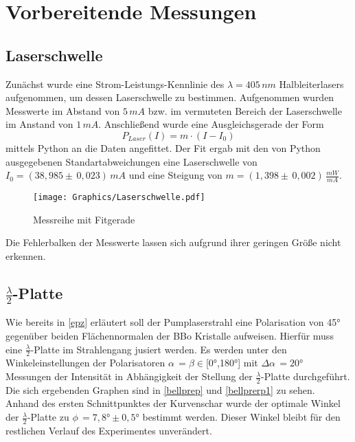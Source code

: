\documentclass[twoside,colorback,accentcolor=tud4c,11pt]{tudreport}
\begin{document}
\section{Vorbereitende Messungen}
\subsection{Laserschwelle}
Zunächst wurde eine Strom-Leistungs-Kennlinie des $\lambda=405\,\si{nm}$ Halbleiterlasers aufgenommen, um dessen Laserschwelle zu bestimmen. Aufgenommen wurden Messwerte im Abstand von $5\,\si{mA}$ bzw. im vermuteten Bereich der Laserschwelle im Anstand von $1\,\si{mA}$. Anschließend wurde eine Ausgleichsgerade der Form
\begin{equation}
P_{Laser}(I)=m\cdot\left(I-I_{0}\right)
\end{equation}
mittels Python an die Daten angefittet. Der Fit ergab mit den von Python ausgegebenen Standartabweichungen eine Laserschwelle von $I_{0}=\left(38,985\pm\,0,023\right)\,\si{mA}$ und eine Steigung von $m=\left(1,398\pm\,0,002\right)\,\si{\frac{mW}{mA}}$.
\begin{figure}[H]
\centering
   	\begin{minipage}[b]{1.0\textwidth}
   	\texttt{[image: Graphics/Laserschwelle.pdf]}
   	\caption{Messreihe mit Fitgerade}
  	\label{laserschwelle}
   	\end{minipage}
\end{figure}
Die Fehlerbalken der Messwerte lassen sich aufgrund ihrer geringen Größe nicht erkennen.
\subsection{$\frac{\lambda}{2}$-Platte}
Wie bereits in \ref{epz} erläutert soll der Pumplaserstrahl eine Polarisation von 45° gegenüber beiden Flächennormalen der BBo Kristalle aufweisen. Hierfür muss eine $\frac{\lambda}{2}$-Platte im Strahlengang jusiert werden. Es werden unter den Winkeleinstellungen der Polarisatoren $\alpha\,=\beta\in$[0°,180°] mit $\Delta\alpha\,=20°$ Messungen der Intensität in Abhängigkeit der Stellung der $\frac{\lambda}{2}$-Platte durchgeführt. Die sich ergebenden Graphen sind in \ref{bellprep} und \ref{bellprerp1} zu sehen. Anhand des ersten Schnittpunktes der Kurvenschar wurde der optimale Winkel der $\frac{\lambda}{2}$-Platte zu $\phi\,=7,8°\pm0,5°$ bestimmt werden. Dieser Winkel bleibt für den restlichen Verlauf des Experimentes unverändert.
\begin{figure}[H]
  \centering
  \quad
  \quad
  \caption{ }
  \label{resisspule}
\end{figure}
\end{document}
